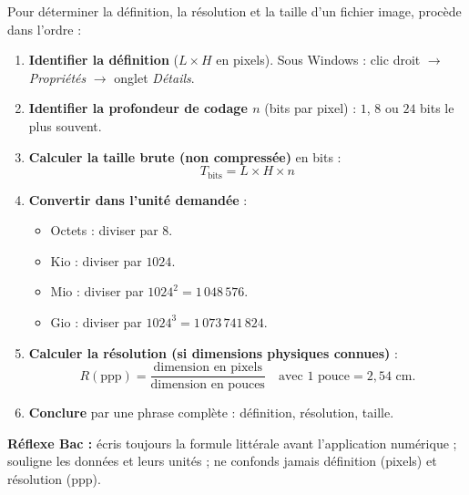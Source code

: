 \documentclass[11pt]{article}
\begin{document}
\begin{methode}
Pour déterminer la définition, la résolution et la taille d'un fichier image, procède dans l'ordre :
\begin{enumerate}
  \item \textbf{Identifier la définition} ($L \times H$ en pixels). Sous Windows : clic droit $\to$ \emph{Propriétés} $\to$ onglet \emph{Détails}.
  \item \textbf{Identifier la profondeur de codage $n$} (bits par pixel) : $1$, $8$ ou $24$ bits le plus souvent.
  \item \textbf{Calculer la taille brute (non compressée)} en bits :
  \[ T_{\text{bits}} = L \times H \times n \]
  \item \textbf{Convertir dans l'unité demandée} :
  \begin{itemize}
    \item Octets : diviser par $8$.
    \item Kio : diviser par $1024$.
    \item Mio : diviser par $1024^2 = 1\,048\,576$.
    \item Gio : diviser par $1024^3 = 1\,073\,741\,824$.
  \end{itemize}
  \item \textbf{Calculer la résolution (si dimensions physiques connues)} :
  \[ R (\text{ppp}) = \frac{\text{dimension en pixels}}{\text{dimension en pouces}} \quad \text{avec } 1 \text{ pouce} = 2,54 \text{ cm}. \]
  \item \textbf{Conclure} par une phrase complète : définition, résolution, taille.
\end{enumerate}
\textbf{Réflexe Bac :} écris toujours la formule littérale avant l'application numérique ; souligne les données et leurs unités ; ne confonds jamais définition (pixels) et résolution (ppp).
\end{methode}
\end{document}
